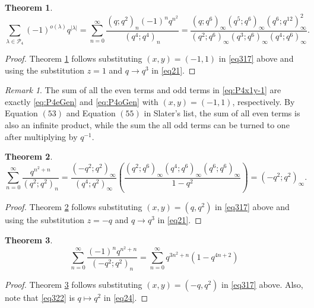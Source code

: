 \documentclass[12pt]{amsart}
\newtheorem{theorem}{Theorem}[section]
\theoremstyle{definition}
\theoremstyle{remark}
\newtheorem{remark}{Remark}
\numberwithin{equation}{section}
\begin{document}
\begin{theorem}\label{thm37}
\begin{equation}\label{eq:P4x-1y1}
\sum_{\lambda\in\mathcal{P}_4}(-1)^{o(\lambda)}q^{|\lambda|}=\sum_{n=0}^{\infty}\frac{(q;q^2)_{n}(-1)^nq^{n^{2}}}{(q^4;q^4)_{n}}=\frac{(q;q^6)_{\infty}(q^5;q^6)_{\infty}(q^6;q^{12})_{\infty}^{2}}{(q^2;q^6)_{\infty}(q^3;q^6)_{\infty}(q^4;q^6)_{\infty}}.   
\end{equation}
\end{theorem}
\begin{proof}Theorem \ref{thm37} follows substituting $(x,y) = (-1,1)$ in \eqref{eq317} above and using the substitution $z=1$ and $q\rightarrow q^3$ in \eqref{eq21}.
\end{proof}

\begin{remark}
The sum of all the even terms and odd terms in \eqref{eq:P4x1y-1} are exactly \eqref{eq:P4eGen} and \eqref{eq:P4oGen} with $(x,y) = (-1,1)$, respectively. By Equation $(53)$ and Equation $(55)$ in Slater's list, the sum of all even terms is also an infinite product, while the sum the all odd terms can be turned to one after multiplying by $q^{-1}$.
\end{remark}

\begin{theorem}\label{thm38}
\begin{equation}\label{eq321}
\sum_{n=0}^{\infty}\frac{q^{n^{2}+n}}{(q^2;q^2)_{n}}=\frac{(-q^2;q^2)_\infty}{(q^4;q^2)_\infty}\left(\frac{(q^2;q^6)_\infty(q^4;q^6)_\infty(q^6;q^6)_\infty}{1-q^2}\right)=(-q^2;q^2)_\infty.   
\end{equation}
\end{theorem}
\begin{proof}Theorem \ref{thm38} follows substituting $(x,y) = (q,q^2)$ in \eqref{eq317} above and using the substitution $z=-q$ and $q\rightarrow q^3$ in \eqref{eq21}.
\end{proof}

\begin{theorem}\label{thm39}
\begin{equation}\label{eq322}
\sum_{n=0}^{\infty}\frac{(-1)^nq^{n^{2}+n}}{(-q^2;q^2)_{n}}=\sum_{n=0}^{\infty}q^{3n^2+n}(1-q^{4n+2})
\end{equation}
\end{theorem}
\begin{proof}
Theorem \ref{thm39} follows substituting $(x,y) = (-q,q^2)$ in \eqref{eq317} above. Also, note that \eqref{eq322} is $q\mapsto q^2$ in \eqref{eq24}.
\end{proof}
\end{document}
